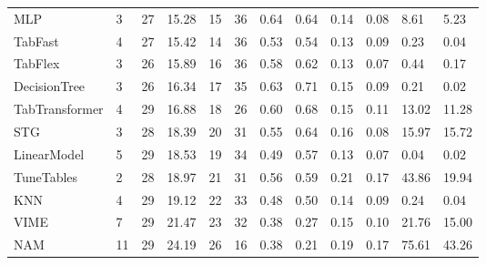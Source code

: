 \begin{tabular}{lllllrllllll}
MLP & 3 & 27 & 15.28 & 15 & 36 & 0.64 & 0.64 & 0.14 & 0.08 & 8.61 & 5.23 \\
TabFast & 4 & 27 & 15.42 & 14 & 36 & 0.53 & 0.54 & 0.13 & 0.09 & 0.23 & 0.04 \\
TabFlex & 3 & 26 & 15.89 & 16 & 36 & 0.58 & 0.62 & 0.13 & 0.07 & 0.44 & 0.17 \\
DecisionTree & 3 & 26 & 16.34 & 17 & 35 & 0.63 & 0.71 & 0.15 & 0.09 & 0.21 & 0.02 \\
TabTransformer & 4 & 29 & 16.88 & 18 & 26 & 0.60 & 0.68 & 0.15 & 0.11 & 13.02 & 11.28 \\
STG & 3 & 28 & 18.39 & 20 & 31 & 0.55 & 0.64 & 0.16 & 0.08 & 15.97 & 15.72 \\
LinearModel & 5 & 29 & 18.53 & 19 & 34 & 0.49 & 0.57 & 0.13 & 0.07 & 0.04 & 0.02 \\
TuneTables & 2 & 28 & 18.97 & 21 & 31 & 0.56 & 0.59 & 0.21 & 0.17 & 43.86 & 19.94 \\
KNN & 4 & 29 & 19.12 & 22 & 33 & 0.48 & 0.50 & 0.14 & 0.09 & 0.24 & 0.04 \\
VIME & 7 & 29 & 21.47 & 23 & 32 & 0.38 & 0.27 & 0.15 & 0.10 & 21.76 & 15.00 \\
NAM & 11 & 29 & 24.19 & 26 & 16 & 0.38 & 0.21 & 0.19 & 0.17 & 75.61 & 43.26 \\
\bottomrule
\end{tabular}
